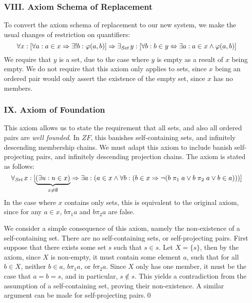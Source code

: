 \documentclass[11pt]{report}
\newcommand{\all}[1]{\forall_{\mathit{#1}}\hspace{0.5mm}}
\newcommand{\ex}[1]{\exists_{\mathit{#1}}\hspace{0.5mm}}
\newcommand{\pleft}{\mathrel{\pi_1}}
\newcommand{\pright}{\mathrel{\pi_2}}
\theoremstyle{definition}
\theoremstyle{theorem}
\theoremstyle{lemma}
\begin{document}
\subsubsection*{VIII. Axiom Schema of Replacement}
To convert the axiom schema of replacement to our new system, we make the usual changes of restriction on quantifiers:
$$\forall x: [\forall a: a\in x \Rightarrow \exists!b: \varphi(a,b)]
  \Rightarrow \ex{Set} y:[\forall b: b\in y \Leftrightarrow
                                     \exists a: a\in x \wedge\varphi(a,b)]$$
We require that $y$ is a set, due to the case where $y$ is empty as a result of $x$ being empty.
We do not require that this axiom only applies to sets, since $x$ being an ordered pair would only assert the existence of the empty set, since $x$ has no members.

\subsubsection*{IX. Axiom of Foundation}
This axiom allows us to state the requirement that all sets, and also all ordered pairs are \emph{well founded}.
In $ZF$, this banishes self-containing sets, and infinitely descending membership chains.
We must adapt this axiom to include banish self-projecting pairs, and infinitely descending projection chains.
The axiom is stated as follows:
$$\all{Set} x: [\underbrace{(\exists u: u\in x)}_{x \neq \emptyset}
  \Rightarrow \exists a: (a\in x \wedge
               \forall b: (b\in x
               \Rightarrow \neg(b\pleft a \vee b\pright a \vee b\in a)))]
$$
In the case where $x$ contains only sets, this is equivalent to the original axiom, since for any $a\in x$, $b\pleft a$ and $b\pright a$ are false.

We consider a simple consequence of this axiom, namely the non-existence of a self-containing set.
\theorem There are no self-containing sets, or self-projecting pairs.
\proof First suppose that there exists some set $s$ such that $s\in s$.
Let $X = \{s\}$, then by the axiom, since $X$ is non-empty, it must contain some element $a$, such that for all $b\in X$, neither $b\in a$, $b\pleft a$, or $b\pright a$.
Since $X$ only has one member, it must be the case that $a=b=s$, and in particular, $s\notin s$.
This yields a contradiction from the assumption of a self-containing set, proving their non-existence.
A similar argument can be made for self-projecting pairs.\qed \\
\end{document}

